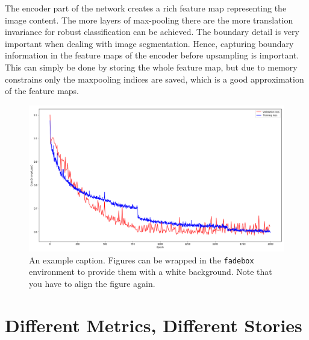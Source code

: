 \documentclass[
]{dtuposter}
\begin{document}
\begin{dtupostercontent}
\begin{figure}
\begin{fadebox}
	\end{fadebox}
	\label{fig:maxpool}
\end{figure}
The encoder part of the network creates a rich feature map representing the image content. The more 
layers of max-pooling there are the more translation invariance for robust 
classification can be achieved. The boundary detail is very important when 
dealing with image segmentation. Hence, capturing boundary information in 
the feature maps of the encoder before upsampling is important. This can 
simply be done by storing the whole feature map, but due to memory 
constrains only the maxpooling indices are saved, which is a good 
approximation of the feature maps. 
\begin{figure}
	\begin{fadebox}\begin{center}
			\includegraphics[width=\linewidth,origin=c]{loss}
	\end{center}\end{fadebox}
	\caption{An example caption. Figures can be wrapped in the \texttt{fadebox} 
		environment to provide them with a white background. Note that you have to align the 
		figure again.}\label{fig:example2}
\end{figure}


\section{Different Metrics, Different Stories}

\begin{table}
	\begin{tabular}{c|ccc|ccc|}
		

\end{tabular}
\end{table}
\end{dtupostercontent}
\end{document}
